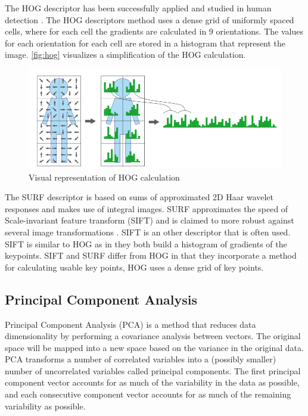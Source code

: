 The HOG descriptor has been successfully applied and studied in human detection \citep{NavneetDalal2006, watanabe2009}. The HOG descriptors method uses a dense grid of uniformly spaced cells, where for each cell the gradients are calculated in 9 orientations. The values for each orientation for each cell are stored in a histogram that represent the image. \autoref{fig:hog} visualizes a simplification of the HOG calculation. 

\begin{figure}[tb]
\center{}
\includegraphics[width=0.8\linewidth]{figures/hog.png}
\caption{Visual representation of HOG calculation}
\label{fig:hog}
\end{figure}


The SURF descriptor is based on sums of approximated 2D Haar wavelet responses and makes use of integral images. SURF approximates the speed of Scale-invariant feature transform (SIFT) and is claimed to more robust against several image transformations \citep{Murillo2007, Valgren2010}. SIFT is an other descriptor that is often used. SIFT is similar to HOG as in they both build a histogram of gradients of the keypoints. SIFT and SURF differ from HOG in that they incorporate a method for calculating usable key points, HOG uses a dense grid of key points.



\subsection{Principal Component Analysis}
Principal Component Analysis (PCA) is a method that reduces data dimensionality by performing a covariance analysis between vectors. The original space will be mapped into a new space based on the variance in the original data. PCA transforms a number of correlated variables into a (possibly smaller) number of uncorrelated variables called principal components. The first principal component vector accounts for as much of the variability in the data as possible, and each consecutive component vector accounts for as much of the remaining variability as possible. 

